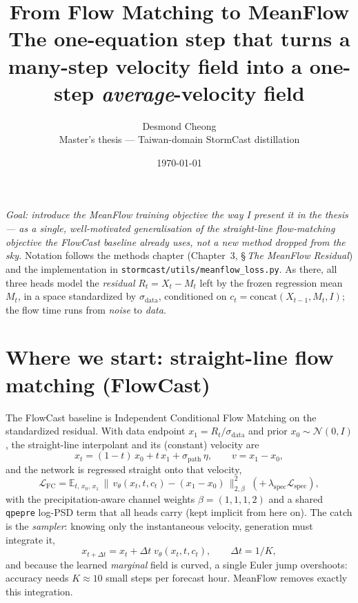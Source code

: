 \documentclass[11pt]{article}
\title{\textbf{From Flow Matching to MeanFlow}\\[2pt]
\large The one-equation step that turns a many-step velocity field
into a one-step \emph{average}-velocity field}
\author{Desmond Cheong \\ \small Master's thesis --- Taiwan-domain StormCast distillation}
\date{\today}
\newcommand{\Rres}{R_t}
\newcommand{\Mt}{M_t}
\newcommand{\ct}{c_t}
\newcommand{\sigd}{\sigma_{\mathrm{data}}}
\newcommand{\Norm}{\mathcal{N}}
\newcommand{\Exp}{\mathbb{E}}
\newcommand{\bnormb}[1]{\big\lVert #1 \big\rVert_{2,\beta}}
\newcommand{\code}[1]{\texttt{#1}}
\begin{document}
\maketitle

\noindent
\textit{Goal: introduce the MeanFlow training objective the way I present it in
the thesis --- as a single, well-motivated generalisation of the straight-line
flow-matching objective the FlowCast baseline already uses, not a new method
dropped from the sky.} Notation follows the methods chapter
(Chapter~3, \S\,\emph{The MeanFlow Residual}) and the implementation in
\code{stormcast/utils/meanflow\_loss.py}. As there, all three heads model the
\emph{residual} $\Rres=X_t-\Mt$ left by the frozen regression mean
$\Mt$, in a space standardized by $\sigd$, conditioned on
$\ct=\mathrm{concat}(X_{t-1},\Mt,I)$; the flow time runs from \emph{noise} to
\emph{data}.

\section{Where we start: straight-line flow matching (FlowCast)}

The FlowCast baseline is Independent Conditional Flow Matching on the
standardized residual. With data endpoint $x_1=\Rres/\sigd$ and prior
$x_0\sim\Norm(0,I)$, the straight-line interpolant and its (constant) velocity
are
\begin{equation}
  x_t = (1-t)\,x_0 + t\,x_1 + \sigma_{\mathrm{path}}\,\eta,
  \qquad
  v = x_1 - x_0 ,
  \label{eq:fm_path}
\end{equation}
and the network is regressed straight onto that velocity,
\begin{equation}
  \mathcal{L}_{\mathrm{FC}}
   = \Exp_{t,\,x_0,\,x_1}\,
        \bnormb{\,v_\theta(x_t,t,\ct) - (x_1 - x_0)\,}^2
     \;(+\,\lambda_{\mathrm{spec}}\mathcal{L}_{\mathrm{spec}}),
  \label{eq:fm_loss}
\end{equation}
with the precipitation-aware channel weights $\beta=(1,1,1,2)$ and a shared
\code{qpepre} log-PSD term that all heads carry (kept implicit from here on).
The catch is the \emph{sampler}: knowing only the instantaneous velocity,
generation must integrate it,
\begin{equation}
  x_{t+\Delta t} = x_t + \Delta t\;v_\theta(x_t,t,\ct),
  \qquad \Delta t = 1/K,
  \label{eq:fm_sampler}
\end{equation}
and because the learned \emph{marginal} field is curved, a single Euler jump
overshoots: accuracy needs $K\!\approx\!10$ small steps per forecast hour.
MeanFlow removes exactly this integration.
\end{document}
